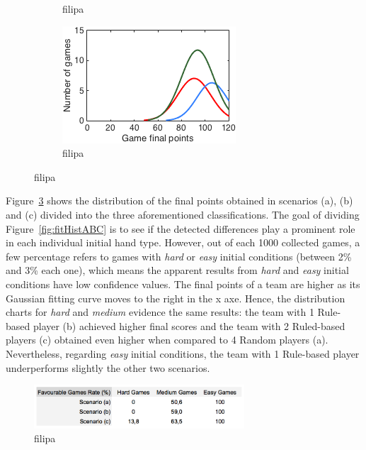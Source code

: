 \begin{figure}[h]
\begin{subfigure}[h]{0.32\textwidth}
                \caption{filipa}
                \label{fig:ABC-Hmedium}
        \end{subfigure}
        \begin{subfigure}[h]{0.32\textwidth}
                \includegraphics[width=\textwidth]{./img/4/ABCeasy}
                \caption{filipa}
                \label{fig:ABC-Heasy}
        \end{subfigure}
        \caption{filipa}
        \label{fig:ABC-CH}
\end{figure}

Figure~\ref{fig:ABC-CH} shows the distribution of the final points obtained in scenarios (a), (b) and (c) divided into the three aforementioned classifications.
The goal of dividing Figure~\ref{fig:fitHistABC} is to see if the detected differences play a prominent role in each individual initial hand type.
However, out of each 1000 collected games, a few percentage refers to games with \emph{hard} or \emph{easy} initial conditions (between 2\% and 3\% each one), which means the apparent results from \emph{hard} and \emph{easy} initial conditions have low confidence values.
The final points of a team are higher as its Gaussian fitting curve moves to the right in the x axe.
Hence, the distribution charts for \emph{hard} and \emph{medium} evidence the same results: the team with 1 Rule-based player (b) achieved higher final scores and the team with 2 Ruled-based players (c) obtained even higher when compared to 4 Random players (a).
Nevertheless, regarding \emph{easy} initial conditions, the team with 1 Rule-based player underperforms slightly the other two scenarios.

\begin{figure}[h!]
  \centering
    \includegraphics[width=0.7\textwidth]{./img/4/ABC-fgr}
  \caption{filipa}
\label{fig:ABC-fgr}
\end{figure}

